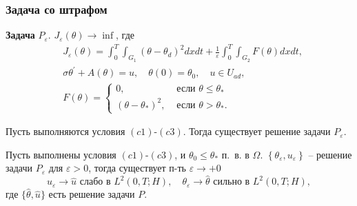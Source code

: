 \begin{frame}
    \frametitle{Задача со штрафом}

    \textbf{Задача} $P_{\varepsilon}$.
    $J_{\varepsilon}(\theta) \rightarrow \inf$, где
    \[
        \begin{aligned}
            & J_{\varepsilon}(\theta)=\int_{0}^{T}
            \int_{G_{1}}\left(\theta-\theta_{d}\right)^{2} dx dt
            +\frac{1}{\varepsilon} \int_{0}^{T}
            \int_{G_{2}} F(\theta) d x d t, \\
            & \sigma \theta^{\prime}+A(\theta)=u,
            \quad \theta(0)=\theta_{0}, \quad u \in U_{a d},\\
            &F(\theta)=
            \begin{cases}
                0, & \text { если } \theta \leq \theta_{*} \\
                \left(\theta-\theta_{*}\right)^{2},
                & \text { если } \theta>\theta_{*}.
            \end{cases}
        \end{aligned}
    \]
    \begin{theorem}[3.2]
        \label{th:3_2:2}
        Пусть выполняются условия $(c1)$-$(c3)$.
        Тогда существует решение задачи $P_{\varepsilon}$.
    \end{theorem}

    \begin{theorem}[3.3]
        \label{th:3_2:3}
        Пусть выполнены условия $(c1)$-$(c3)$, и $\theta_{0} \leq \theta_{*}$ п.\ в. в $\Omega$.
        $\left\{\theta_{\varepsilon}, u_{\varepsilon}\right\}$ -- решение задачи
        $P_{\varepsilon}$ для $\varepsilon>0$, тогда существует п-ть $\varepsilon \rightarrow+0$
        \[
            u_{\varepsilon} \rightarrow \widehat{u} \text { слабо в } L^{2}(0, T ; H), \quad
            \theta_{\varepsilon} \rightarrow \widehat{\theta} \text { сильно в } L^{2}(0, T ; H),
        \]
        где $\{\widehat{\theta}, \widehat{u}\}$ есть решение задачи $P$\@.
    \end{theorem}
\end{frame}

